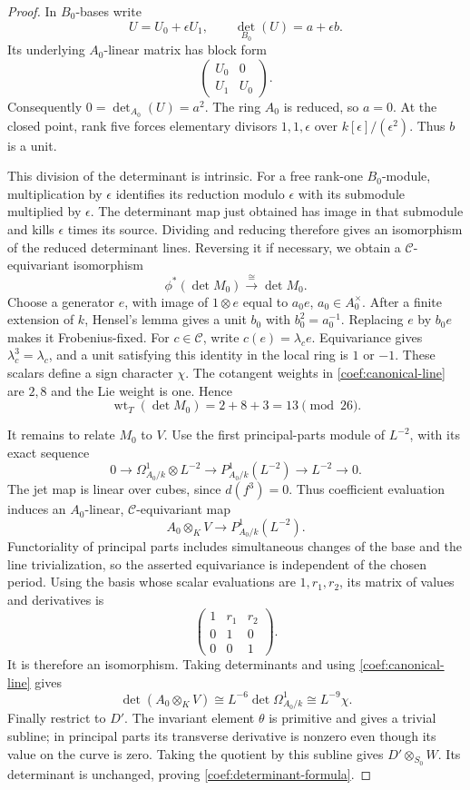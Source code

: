 \begin{proof}
In \(B_0\)-bases write
\[
 U=U_0+\epsilon U_1,\qquad
 \det_{B_0}(U)=a+\epsilon b.
\]
Its underlying \(A_0\)-linear matrix has block form
\[
 \begin{pmatrix}U_0&0\\ U_1&U_0\end{pmatrix}.
\]
Consequently \(0=\det_{A_0}(U)=a^2\).
The ring \(A_0\) is reduced, so \(a=0\).
At the closed point, rank five forces elementary divisors
\(1,1,\epsilon\) over \(k[\epsilon]/(\epsilon^2)\).
Thus \(b\) is a unit.

This division of the determinant is intrinsic.  For a free
rank-one \(B_0\)-module, multiplication by \(\epsilon\) identifies
its reduction modulo \(\epsilon\) with its submodule multiplied
by \(\epsilon\).  The determinant map just obtained has image
in that submodule and kills \(\epsilon\) times its source.
Dividing and reducing therefore gives an isomorphism of the
reduced determinant lines.  Reversing it if necessary, we obtain
a \(\mathcal C\)-equivariant isomorphism
\[
 \phi^*(\det M_0)\xrightarrow{\ \cong\ }\det M_0.
\]
Choose a generator \(e\), with image of \(1\otimes e\) equal
to \(a_0e\), \(a_0\in A_0^\times\).
After a finite extension of \(k\), Hensel's lemma gives a unit
\(b_0\) with \(b_0^2=a_0^{-1}\).
Replacing \(e\) by \(b_0e\) makes it Frobenius-fixed.
For \(c\in\mathcal C\), write \(c(e)=\lambda_c e\).
Equivariance gives \(\lambda_c^3=\lambda_c\), and a unit
satisfying this identity in the local ring is \(1\) or \(-1\).
These scalars define a sign character \(\chi\).
The cotangent weights in \eqref{coef:canonical-line} are \(2,8\)
and the Lie weight is one.  Hence
\[
 \operatorname{wt}_T(\det M_0)=2+8+3=13\pmod{26}.
\]

It remains to relate \(M_0\) to \(V\).  Use the first
principal-parts module of \(L^{-2}\), with its exact sequence
\[
 0\longrightarrow\Omega^1_{A_0/k}\otimes L^{-2}
 \longrightarrow P^1_{A_0/k}(L^{-2})
 \longrightarrow L^{-2}\longrightarrow0.
\]
The jet map is linear over cubes, since \(d(f^3)=0\).
Thus coefficient evaluation induces an \(A_0\)-linear,
\(\mathcal C\)-equivariant map
\[
 A_0\otimes_K V\longrightarrow P^1_{A_0/k}(L^{-2}).
\]
Functoriality of principal parts includes simultaneous changes
of the base and the line trivialization, so the asserted
equivariance is independent of the chosen period.
Using the basis whose scalar evaluations are \(1,r_1,r_2\),
its matrix of values and derivatives is
\[
 \begin{pmatrix}
 1&r_1&r_2\\
 0&1&0\\
 0&0&1
 \end{pmatrix}.
\]
It is therefore an isomorphism.  Taking determinants and using
\eqref{coef:canonical-line} gives
\[
 \det(A_0\otimes_KV)
 \cong L^{-6}\det\Omega^1_{A_0/k}
 \cong L^{-9}\chi.
\]
Finally restrict to \(D'\).  The invariant element \(\theta\)
is primitive and gives a trivial subline; in principal parts
its transverse derivative is nonzero even though its value
on the curve is zero.  Taking the quotient by this subline
gives \(D'\otimes_{S_0}W\).
Its determinant is unchanged, proving
\eqref{coef:determinant-formula}.
\end{proof}

